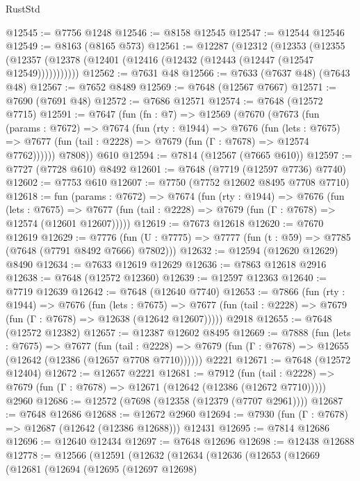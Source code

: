 \begin{lexlean}{RustStd}
\begin{coremodule}
@12545 := @7756 @1248
@12546 := @8158 @12545
@12547 := @12544 @12546
@12549 := @8163 (@8165 @573)
@12561 := @12287
    (@12312
      (@12353
        (@12355 (@12357 (@12378 (@12401 (@12416 (@12432 (@12443 (@12447 (@12547 @12549)))))))))))
@12562 := @7631 @48
@12566 := @7633 (@7637 @48) (@7643 @48)
@12567 := @7652 @8489
@12569 := @7648 (@12567 @7667)
@12571 := @7690 (@7691 @48)
@12572 := @7686 @12571
@12574 := @7648 (@12572 @7715)
@12591 := @7647
    (fun (fn : @7) =>
    @12569
      (@7670
        (@7673
          (fun (params : @7672) =>
          @7674
            (fun (rty : @1944) =>
            @7676
              (fun (lets : @7675) =>
              @7677 (fun (tail : @2228) => @7679 (fun (Γ : @7678) => @12574 @7762))))))
        @7808))
    @610
@12594 := @7814 (@12567 (@7665 @610))
@12597 := @7727 (@7728 @610) @8492
@12601 := @7648 (@7719 (@12597 @7736) @7740)
@12602 := @7753 @610
@12607 := @7750 (@7752 @12602 @8495 @7708 @7710)
@12618 := fun (params : @7672) =>
  @7674
    (fun (rty : @1944) =>
    @7676
      (fun (lets : @7675) =>
      @7677 (fun (tail : @2228) => @7679 (fun (Γ : @7678) => @12574 (@12601 @12607)))))
@12619 := @7673 @12618
@12620 := @7670 @12619
@12629 := @7776
    (fun (U : @7775) => @7777 (fun (t : @59) => @7785 (@7648 (@7791 @8492 @7666) @7802)))
@12632 := @12594 (@12620 @12629) @8490
@12634 := @7633 @12619 @12629
@12636 := @7863 @12618 @2916
@12638 := @7648 (@12572 @12360)
@12639 := @12597 @12363
@12640 := @7719 @12639
@12642 := @7648 (@12640 @7740)
@12653 := @7866
    (fun (rty : @1944) =>
    @7676
      (fun (lets : @7675) =>
      @7677 (fun (tail : @2228) => @7679 (fun (Γ : @7678) => @12638 (@12642 @12607)))))
    @2918
@12655 := @7648 (@12572 @12382)
@12657 := @12387 @12602 @8495
@12669 := @7888
    (fun (lets : @7675) =>
    @7677
      (fun (tail : @2228) =>
      @7679 (fun (Γ : @7678) => @12655 (@12642 (@12386 (@12657 @7708 @7710))))))
    @2221
@12671 := @7648 (@12572 @12404)
@12672 := @12657 @2221
@12681 := @7912
    (fun (tail : @2228) => @7679 (fun (Γ : @7678) => @12671 (@12642 (@12386 (@12672 @7710)))))
    @2960
@12686 := @12572 (@7698 (@12358 (@12379 (@7707 @2961))))
@12687 := @7648 @12686
@12688 := @12672 @2960
@12694 := @7930 (fun (Γ : @7678) => @12687 (@12642 (@12386 @12688))) @12431
@12695 := @7814 @12686
@12696 := @12640 @12434
@12697 := @7648 @12696
@12698 := @12438 @12688
@12778 := @12566
    (@12591
      (@12632
        (@12634
          (@12636
            (@12653
              (@12669
                (@12681
                  (@12694
                    (@12695
                      (@12697 @12698)

\end{coremodule}
\end{lexlean}
